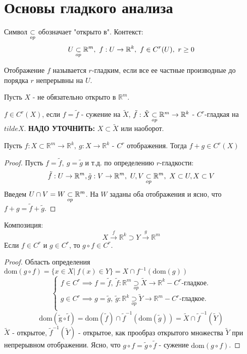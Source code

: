 \section{Основы гладкого анализа}
Символ $\underset{op}{\subset}$ обозначает "открыто в". Контекст:
\[U \underset{op}{\subset} \mathbb{R}^m, \ f:U \to \mathbb{R}^k, \ f \in C^r(U), \ r \geq 0\]

\begin{definition}
    Отображение $f$ называется $r$-гладким, если все ее частные производные до порядка $r$ непрерывны на $U$.
\end{definition}

Пусть $X$ - не обязательно открыто в $\mathbb{R}^m$.
\begin{definition}
    $f \in C^r(X)$, если $f = \tilde{f}$ - сужение на $\tilde{X}$, $\tilde{f}: \tilde{X} \underset{op}{\subset} \mathbb{R}^m \to \mathbb{R}^k$ - $C^r$-гладкая на $tilde{X}$. \textbf{НАДО УТОЧНИТЬ:} $X \subset \tilde{X}$ или наоборот.
\end{definition}

\begin{statement}
    Пусть $f:X \subset \mathbb{R}^m \to \mathbb{R}^k, \ g:X \to \mathbb{R}^k$ - $C^r$ отображения. Тогда $f+g \in C^r(X)$
    \begin{proof}
        Пусть $f = \tilde{f}, \ g = \tilde{g}$ и т.д. по определению $r$-гладкости:
        \[\tilde{f}:U \to \mathbb{R}^m, \tilde{g}: V \to \mathbb{R}^m, \ U, V \underset{op}{\subset} \mathbb{R}^m, \ X \subset U, X \subset V\]
        Введем $U \cap V = W \underset{op}{\subset} \mathbb{R}^m$. На $W$ заданы оба отображения и ясно, что $f+g = \tilde{f} + \tilde{g}$.
    \end{proof}
\end{statement}

\begin{statement}
    Композиция:
    \[X \overset{f}{\to} \mathbb{R}^k \supset Y \overset{g}{\to} \mathbb{R}^m\]
    Если $f \in C^r$ и $g \in C^r$, то $g \circ f \in C^r$.
    \begin{proof}
        Область определения $\mathrm{dom}(g \circ f) = \{x \in X | \ f(x) \in Y\} = X \cap f^{-1}(\mathrm{dom}(g))$
        \[\begin{cases}
            f \in C^r \implies f = \tilde{f}, \ \tilde{f}:\mathbb{R}^m \underset{op}{\supset}\tilde{X} \to \mathbb{R}^k -  C^r\text{-гладкое.} \\
            g \in C^r \implies g = \tilde{g}, \ \tilde{g}:\mathbb{R}^k \underset{op}{\supset}\tilde{Y} \to \mathbb{R}^m -  C^r\text{-гладкое.} \\
        \end{cases}\]
        \[\mathrm{dom(\tilde{g}\circ \tilde{f})} = \mathrm{dom}(\tilde{f}) \cap \tilde{f}^{-1}(\mathrm{dom}(\tilde{g})) = \tilde{X} \cap \tilde{f}^{-1}(\tilde{Y})\]
        $\tilde{X}$ - открытое, $\tilde{f}^{-1}(\tilde{Y})$ - открытое, как прообраз открытого множества $\tilde{Y}$ при непрерывном отображении.
        \newline
        Ясно, что $g \circ f = \tilde{g} \circ \tilde{f}$ - сужение $\mathrm{dom}(g \circ f)$.
    \end{proof}
\end{statement}

